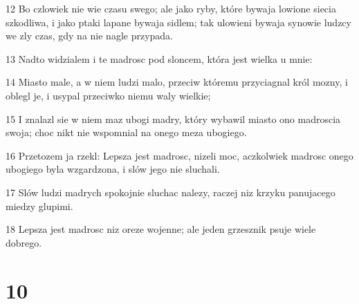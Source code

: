 \par 12 Bo czlowiek nie wie czasu swego; ale jako ryby, które bywaja lowione siecia szkodliwa, i jako ptaki lapane bywaja sidlem; tak ulowieni bywaja synowie ludzcy we zly czas, gdy na nie nagle przypada.
\par 13 Nadto widzialem i te madrosc pod sloncem, która jest wielka u mnie:
\par 14 Miasto male, a w niem ludzi malo, przeciw któremu przyciagnal król mozny, i oblegl je, i usypal przeciwko niemu waly wielkie;
\par 15 I znalazl sie w niem maz ubogi madry, który wybawil miasto ono madroscia swoja; choc nikt nie wspomnial na onego meza ubogiego.
\par 16 Przetozem ja rzekl: Lepsza jest madrosc, nizeli moc, aczkolwiek madrosc onego ubogiego byla wzgardzona, i slów jego nie sluchali.
\par 17 Slów ludzi madrych spokojnie sluchac nalezy, raczej niz krzyku panujacego miedzy glupimi.
\par 18 Lepsza jest madrosc niz oreze wojenne; ale jeden grzesznik psuje wiele dobrego.

\chapter{10}


